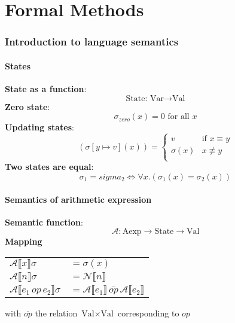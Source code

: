 \documentclass[11.5pt]{article}
\def\li{\rightarrow}
\def\fax{\forall x.}
\def\A{\mathcal{A}}
\def\llb{\llbracket}
\def\rrb{\rrbracket}
\begin{document}
\part*{Formal Methods}
\setcounter{section}{0}
\renewcommand*{\theHsection}{chY.\the\value{section}}

\section{Introduction to language semantics}
\subsection{States}
\textbf{State as a function}: 
$$\text{State: Var} \li \text{Val}$$ 
\textbf{Zero state}: 
$$\sigma_{zero}(x)=0\text{ for all }x$$
\textbf{Updating states}: 
$$ (\sigma[y\mapsto v](x)) = \begin{cases}
v & \text{if } x \equiv y \\
\sigma(x) & x \not\equiv y \\
\end{cases}
$$
\textbf{Two states are equal}:
$$ \sigma_1 = sigma_2 \Leftrightarrow \fax (\sigma_1(x) = \sigma_2(x))$$

\subsection{Semantics of arithmetic expression}
\textbf{Semantic function}:
$$ \A: \text{Aexp}\li \text{State} \li \text{Val}$$
\textbf{Mapping} \\
\begin{center}
\begin{tabular}{l l}
    $\A \llb x\rrb \sigma$ & $= \sigma(x)$ \\
    $\A \llb n\rrb \sigma$ & $= \mathcal{N}\llb n\rrb$ \\
    $\A \llb e_1 \, op \, e_2\rrb \sigma$ & $= \A\llb e_1\rrb \, \overline{op} \, \A\llb e_2\rrb$ 
\end{tabular}
\end{center}
with $\overline{op}$ the relation $\text{Val}\times\text{Val}$ corresponding to $op$
\end{document}
